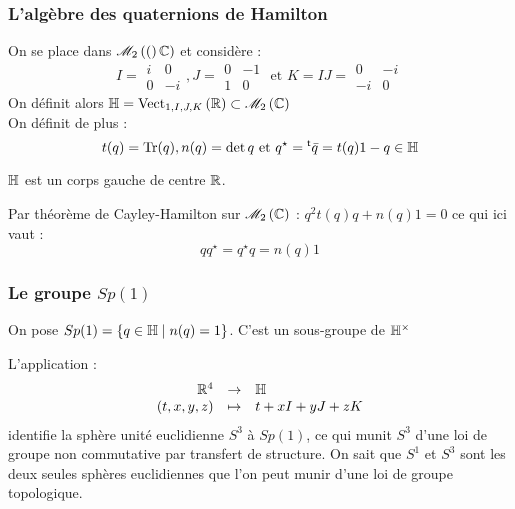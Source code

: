 \documentclass{cours}
\begin{document}
\subsubsection{L'algèbre des quaternions de Hamilton}
\begin{definition}
    On se place dans $\mat{2}(\C)$ et considère :
    \[
        I = \begin{matrix}
            i & 0\\ 0 & -i
        \end{matrix},
        J = \begin{matrix}
            0 & -1 \\ 1 & 0
        \end{matrix}
        \text{ et } K = IJ = \begin{matrix}
            0 & -i\\ -i & 0
        \end{matrix}
    \]
    On définit alors $\mathbb{H} = \vect[\R]{1, I, J, K} \subset \mat{2}{\C}$\\

    On définit de plus : 
    \[
        t(q) = \Tr(q), n(q) = \det q \text{ et } q^{\star} = \transpose{\bar{q}} = t(q)1 - q \in \H
    \]
\end{definition}

\begin{proposition}
    $\H$ est un corps gauche de centre $\R$.
\end{proposition}

\begin{proposition}
    Par théorème de Cayley-Hamilton sur $\mat{2}{\C}$ : $q^{2}t(q)q + n(q)1 = 0$ ce qui ici vaut : 
    \[qq^{\star} = q^{\star}q = n(q)1\]
\end{proposition}


\subsubsection{Le groupe $Sp(1)$}
\begin{definition}
    On pose $Sp(1) = \left\{q \in \H \mid n(q) = 1\right\}$. C'est un sous-groupe de $\H^{\times}$
\end{definition}

\begin{remark}
    L'application : 
    \[
        \applic{\R^{4}}{\H}{\left(t, x, y, z\right)}{t + xI + yJ + zK}
    \]
    identifie la sphère unité euclidienne $S^{3}$ à $Sp(1)$, ce qui munit $S^{3}$ d'une loi de groupe non commutative par transfert de structure. On sait que $S^{1}$ et $S^{3}$ sont les deux seules sphères euclidiennes que l'on peut munir d'une loi de groupe topologique.
\end{remark}
\end{document}
